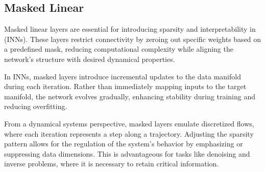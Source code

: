 \documentclass[sigconf]{acmart}
\begin{document}
\subsection{Masked Linear}

Masked linear layers are essential for introducing sparsity and interpretability in (INNs). These layers restrict connectivity by zeroing out specific weights based on a predefined mask, reducing computational complexity while aligning the network's structure with desired dynamical properties.

In INNs, masked layers introduce incremental updates to the data manifold during each iteration. Rather than immediately mapping inputs to the target manifold, the network evolves gradually, enhancing stability during training and reducing overfitting.

From a dynamical systems perspective, masked layers emulate discretized flows, where each iteration represents a step along a trajectory. Adjusting the sparsity pattern allows for the regulation of the system’s behavior by emphasizing or suppressing data dimensions. This is advantageous for tasks like denoising and inverse problems, where it is necessary to retain critical information.\cite{hershey2024rethinking} 




\end{document}
